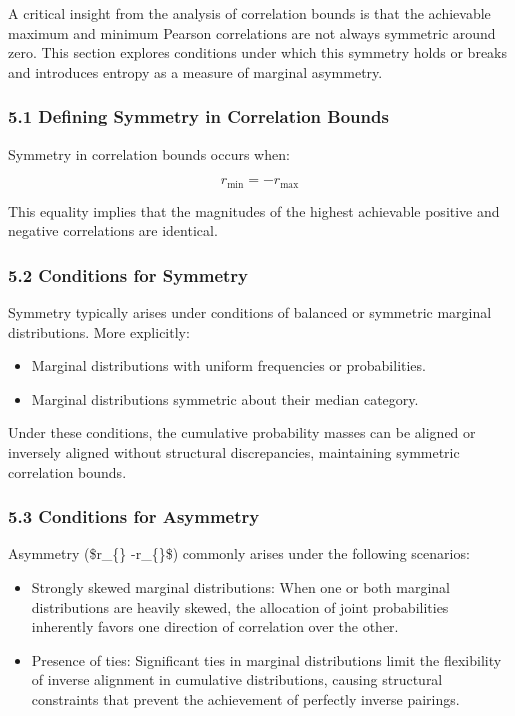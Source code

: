 \documentclass[
  12pt,
]{article}
\providecommand{\tightlist}{%
  \setlength{\itemsep}{0pt}\setlength{\parskip}{0pt}}\usepackage{longtable,booktabs,array}
\begin{document}
A critical insight from the analysis of correlation bounds is that the
achievable maximum and minimum Pearson correlations are not always
symmetric around zero. This section explores conditions under which this
symmetry holds or breaks and introduces entropy as a measure of marginal
asymmetry.

\subsubsection{5.1 Defining Symmetry in Correlation
Bounds}\label{defining-symmetry-in-correlation-bounds}

Symmetry in correlation bounds occurs when:

\[
r_{\text{min}} = -r_{\text{max}}
\]

This equality implies that the magnitudes of the highest achievable
positive and negative correlations are identical.

\subsubsection{5.2 Conditions for
Symmetry}\label{conditions-for-symmetry}

Symmetry typically arises under conditions of balanced or symmetric
marginal distributions. More explicitly:

\begin{itemize}
\tightlist
\item
  Marginal distributions with uniform frequencies or probabilities.
\item
  Marginal distributions symmetric about their median category.
\end{itemize}

Under these conditions, the cumulative probability masses can be aligned
or inversely aligned without structural discrepancies, maintaining
symmetric correlation bounds.

\subsubsection{5.3 Conditions for
Asymmetry}\label{conditions-for-asymmetry}

Asymmetry (\$r\_\{\} \ne -r\_\{\}\$) commonly arises
under the following scenarios:

\begin{itemize}
\tightlist
\item
  Strongly skewed marginal distributions: When one or both marginal
  distributions are heavily skewed, the allocation of joint
  probabilities inherently favors one direction of correlation over the
  other.
\item
  Presence of ties: Significant ties in marginal distributions limit the
  flexibility of inverse alignment in cumulative distributions, causing
  structural constraints that prevent the achievement of perfectly
  inverse pairings.
\end{itemize}
\end{document}
